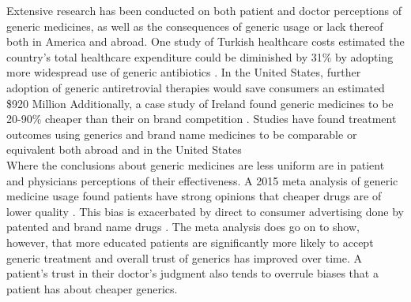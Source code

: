 \indent Extensive research has been conducted on both patient and doctor perceptions of generic medicines, as well as the consequences of generic usage or lack thereof both in America and abroad. One study of Turkish healthcare costs estimated the country's total healthcare expenditure could be diminished by 31\% by adopting more widespread use of generic antibiotics \cite{mercanoglu_evaluation_2018}. In the United States, further adoption of generic antiretrovial therapies would save consumers an estimated \$920 Million \cite{walensky_economic_2013} Additionally, a case study of Ireland found generic medicines to be 20-90\% cheaper than their on brand competition \cite{dunne_review_2013}. Studies have found treatment outcomes using generics and brand name medicines to be comparable or equivalent both abroad \cite{lin_comparative_2017} and in the United States \cite{desai_comparative_2019}\\
\indent Where the conclusions about generic medicines are less uniform are in patient and physicians perceptions of their effectiveness. A 2015 meta analysis of generic medicine usage found patients have strong opinions that cheaper drugs are of lower quality \cite{dunne_what_2015}. This bias is exacerbated by direct to consumer advertising done by patented and brand name drugs \cite{morgan_economics_2003}. The meta analysis does go on to show, however, that more educated patients are significantly more likely to accept generic treatment and overall trust of generics has improved over time. A patient's trust in their doctor's judgment also tends to overrule biases that a patient has about cheaper generics.

